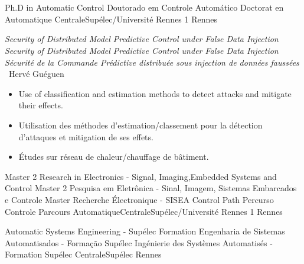 \section{\education}

\cventry{\nov\ 2019 \newline\dec\ 2022\newline}
{
  \ml%
  {Ph.D in Automatic Control}
  {Doutorado em Controle Automático}
  {Doctorat en Automatique}%
}
{\newline CentraleSupélec/Université Rennes 1%
}
{Rennes}{\france}
{
  \ml%
  {
    \emph{Security of Distributed Model Predictive Control under False Data Injection}
  }%
  {
    \emph{Security of Distributed Model Predictive Control under False Data Injection}
  }%
  {\emph{Sécurité de la Commande Prédictive distribuée sous injection de données faussées}}%
  \\
  \supervisor\ Hervé Guéguen
  \ml
  {\begin{itemize}
    \item Use of classification and estimation methods to detect attacks and mitigate their effects.
  \end{itemize}}
  {}
  {\begin{itemize}
     \item Utilisation des méthodes d'estimation/classement pour la détection d'attaques et mitigation de ses effets.
     \item Études sur réseau de chaleur/chauffage de bâtiment.
  \end{itemize}
  }
}

\cventry{\sep\ 2017 \newline \sep\ 2018\newline}
{
  \ml%
  {Master 2 Research in Electronics - Signal, Imaging,Embedded Systems and Control}
  {Master 2 Pesquisa em Eletrônica - Sinal, Imagem,
    Sistemas Embarcados e Controle}
  {Master Recherche Électronique - SISEA}%
}
{\ml%
  {Control Path}
  {Percurso Controle}
  {Parcours Automatique}\newline CentraleSupélec/Université Rennes 1%
}
{Rennes}{\france}{}

\cventry{\sep\ 2016\newline \sep\ 2018\newline}
{
  \ml%
  {Automatic Systems Engineering - Supélec Formation}
  {Engenharia de Sistemas Automatisados - Formação Supélec}
  {Ingénierie des Systèmes Automatisés - Formation Supélec}}
{\newline CentraleSupélec}
{Rennes}{\france}{}

